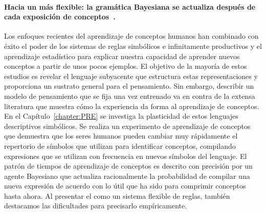 \paragraph{Hacia un \lot más flexible: la gramática Bayesiana se actualiza después de cada exposición de conceptos~\cite{tano2020towards}.}
Los enfoques recientes del aprendizaje de conceptos humanos han combinado con éxito el poder de los sistemas de reglas simbólicos e infinitamente productivos y el aprendizaje estadístico para explicar nuestra capacidad de aprender nuevos conceptos a partir de unos pocos ejemplos. El objetivo de la mayoría de estos estudios es revelar el lenguaje subyacente que estructura estas representaciones y proporciona un sustrato general para el pensamiento. Sin embargo, describir un modelo de pensamiento que se fija una vez entrenado va en contra de la extensa literatura que muestra cómo la experiencia da forma al aprendizaje de conceptos. En el Capítulo~\ref{chapter:PRE} se investiga la plasticidad de estos lenguajes descriptivos simbólicos. Se realiza un experimento de aprendizaje de conceptos que demuestra que los seres humanos pueden cambiar muy rápidamente el repertorio de símbolos que utilizan para identificar conceptos, compilando expresiones que se utilizan con frecuencia en nuevos símbolos del lenguaje. El patrón de tiempos de aprendizaje de conceptos es descrito con precisión por un agente Bayesiano que actualiza racionalmente la probabilidad de compilar una nueva expresión de acuerdo con lo útil que ha sido para comprimir conceptos hasta ahora. Al presentar el \lot como un sistema flexible de reglas, también destacamos las dificultades para precisarlo empíricamente.

